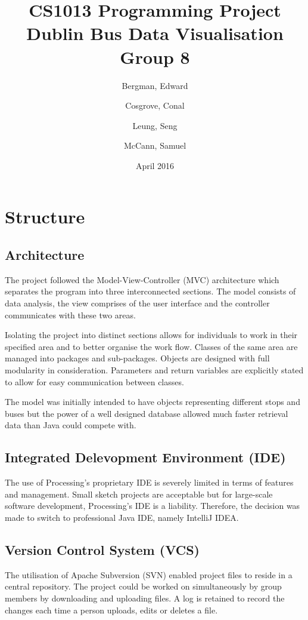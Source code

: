 \documentclass[]{article}
\title{CS1013 Programming Project\\Dublin Bus Data Visualisation \\ Group 8}
\date{April 2016}
\author{
	Bergman, Edward
	\and 
	Cosgrove, Conal
	\and
	Leung, Seng
	\and
	McCann, Samuel}
\begin{document}
	\maketitle
	
	
	\section{Structure}
	
	\subsection{Architecture}
	
	The project followed the Model-View-Controller (MVC) architecture which separates the program into three interconnected sections. The model consists of data analysis, the view comprises of the user interface and the controller communicates with these two areas.
	
	Isolating the project into distinct sections allows for individuals to work in their specified area and to better organise the work flow. Classes of the same area are managed into packages and sub-packages. Objects are designed with full modularity in consideration. Parameters and return variables are explicitly stated to allow for easy communication between classes.
	
	The model was initially intended to have objects representing different stops and buses but the power of a well designed database allowed much faster retrieval data than Java could compete with.
	
	\subsection{Integrated Delevopment Environment (IDE)}
	
	The use of Processing's proprietary IDE is severely limited in terms of features and management. Small sketch projects are acceptable but for large-scale software development, Processing's IDE is a liability. Therefore, the decision was made to switch to professional Java IDE, namely IntelliJ IDEA.
	
	\subsection{Version Control System (VCS)}
	
	The utilisation of Apache Subversion (SVN) enabled project files to reside in a central repository. The project could be worked on simultaneously by group members by downloading and uploading files. A log is retained to record the changes each time a person uploads, edits or deletes a file. 
	
\end{document}
